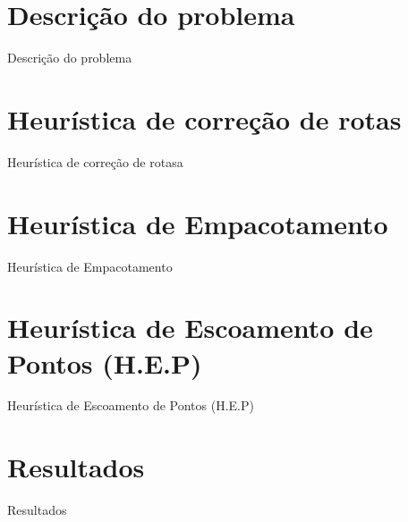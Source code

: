 \documentclass[12pt]{beamer}
\begin{document}
\section{Descri\c{c}\~ao do problema}
	\begin{frame}{Descri\c{c}\~ao do problema}
	\end{frame}


\section{Heur\'istica de corre\c{c}\~ao de rotas} %
	\begin{frame}{Heur\'istica de corre\c{c}\~ao de rotasa}
\end{frame}
\section{Heur\'istica de Empacotamento} %
	\begin{frame}{Heur\'istica de Empacotamento}
\end{frame}
\section{Heur\'istica de Escoamento de Pontos (H.E.P)} %
	\begin{frame}{Heur\'istica de Escoamento de Pontos (H.E.P)}
\end{frame}
\section{Resultados} %
	\begin{frame}{Resultados}
\end{frame}

	
	
	
	
\end{document}

